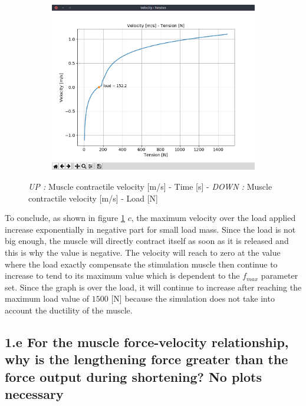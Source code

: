 \documentclass{cmc}
\begin{document}
\begin{figure}[H]
    \begin{subfigure}[b]{0.55\textwidth}
        \includegraphics[width=\textwidth,trim={0.5cm 1.25cm 1.5cm 1.5cm},clip]{1d/isotonic_vce_load.png}
    \end{subfigure}
    \caption{\textit{UP :} Muscle contractile velocity [m/s] - Time [s] - \textit{DOWN :} Muscle contractile velocity [m/s] - Load [N]}
    \label{fig:isotonic_load}
\end{figure}

To conclude, as shown in figure \ref{fig:isotonic_load} $c$, the maximum velocity over the load applied increase exponentially in negative part for small load mass. Since the load is not big enough, the muscle will directly contract itself as soon as it is released and this is why the value is negative. The velocity will reach to zero at the value where the load exactly compensate the stimulation muscle then continue to increase to tend to its maximum value which is dependent to the $f_{max}$ parameter set. Since the graph is over the load, it will continue to increase after reaching the maximum load value of $1500$ [N] because the simulation does not take into account the ductility of the muscle.

\subsection*{1.e For the muscle force-velocity relationship, why is the lengthening force greater than the force output during shortening? No plots necessary}
\end{document}
